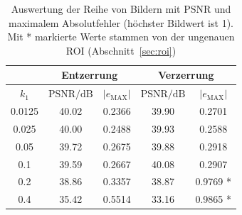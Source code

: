 \begin{table}
	\centering
\begin{tabular}{|c|c|c|c|c|}
	\hline 
	\rule[-1ex]{0pt}{2.5ex}  & \multicolumn{2}{c|}{Entzerrung} & \multicolumn{2}{c|}{Verzerrung}  \\ 
	\hline 
	\rule[-1ex]{0pt}{2.5ex} $k_1$ & $\text{PSNR}/\text{dB}$ & $|e_\text{MAX}|$ & $\text{PSNR}/\text{dB}$ & $|e_\text{MAX}|$ \\ 
	\hline 
	\rule[-1ex]{0pt}{2.5ex} 0.0125 & 40.02 & 0.2366 & 39.90 & 0.2701 \\ 
	\hline 
	\rule[-1ex]{0pt}{2.5ex} 0.025 & 40.00 & 0.2488 & 39.93 & 0.2588 \\ 
	\hline 
	\rule[-1ex]{0pt}{2.5ex} 0.05 & 39.72 & 0.2675 & 39.88 & 0.2918 \\ 
	\hline 
	\rule[-1ex]{0pt}{2.5ex} 0.1 & 39.59 & 0.2667 & 40.08 & 0.2907 \\ 
	\hline 
	\rule[-1ex]{0pt}{2.5ex} 0.2 & 38.86 & 0.3357 & 38.87 & 0.9769 * \\ 
	\hline 
	\rule[-1ex]{0pt}{2.5ex} 0.4 & 35.42 & 0.5514 & 33.16 & 0.9865 * \\ 
	\hline 
\end{tabular} 

\caption{Auswertung der Reihe von Bildern mit PSNR und maximalem Absolutfehler (höchster Bildwert ist 1). Mit * markierte Werte stammen von der ungenauen ROI (Abschnitt~\ref{sec:roi})}
\label{tbl:comparison}
\end{table}
